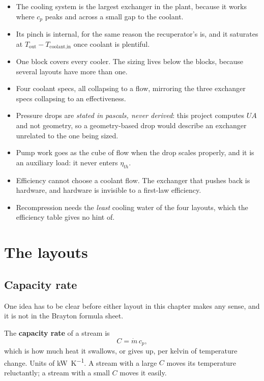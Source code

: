 \documentclass[11pt,a4paper]{report}
\begin{document}
\begin{itemize}\itemsep2pt
\item The cooling system is the largest exchanger in the plant, because it
      works where $c_p$ peaks and across a small gap to the coolant.
\item Its pinch is internal, for the same reason the recuperator's is, and
      it saturates at
      $T_{\text{out}} - T_{\text{coolant,in}}$ once coolant is plentiful.
\item One block covers every cooler. The sizing lives below the blocks,
      because several layouts have more than one.
\item Four coolant specs, all collapsing to a flow, mirroring the three
      exchanger specs collapsing to an effectiveness.
\item Pressure drops are \emph{stated in pascals, never derived}: this
      project computes $UA$ and not geometry, so a geometry-based drop would
      describe an exchanger unrelated to the one being sized.
\item Pump work goes as the cube of flow when the drop scales properly, and
      it is an auxiliary load: it never enters $\eta_{th}$.
\item Efficiency cannot choose a coolant flow. The exchanger that pushes
      back is hardware, and hardware is invisible to a first-law efficiency.
\item Recompression needs the \emph{least} cooling water of the four
      layouts, which the efficiency table gives no hint of.
\end{itemize}
\chapter{The layouts}
\label{ch:splitting}

\section{Capacity rate}
\label{sec:capacityrate}

One idea has to be clear before either layout in this chapter makes any
sense, and it is not in the Brayton formula sheet.

The \textbf{capacity rate} of a stream is
\[
  C = \dot m \, c_p,
\]
which is how much heat it swallows, or gives up, per kelvin of temperature
change. Units of \si{\kilo\watt\per\kelvin}. A stream with a large $C$ moves
its temperature reluctantly; a stream with a small $C$ moves it easily.
\end{document}
